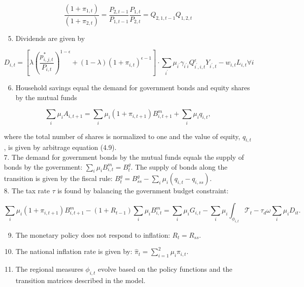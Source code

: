 \documentclass[10pt]{article}
\begin{document}
$$
\frac{\left(1+\pi_{1, t}\right)}{\left(1+\pi_{2, t}\right)}=\frac{P_{2, t-1}}{P_{1, t-1}} \frac{P_{1, t}}{P_{2, t}}=Q_{2,1, t-1} Q_{1,2, t}
$$

\begin{enumerate}
  \setcounter{enumi}{4}
  \item Dividends are given by
\end{enumerate}

$$
D_{i, t}=\left[\lambda\left(\frac{p_{i, j, t}^{*}}{P_{i, t}}\right)^{1-\epsilon}+(1-\lambda)\left(1+\pi_{i, t}\right)^{\epsilon-1}\right] \cdot \sum_{i^{\prime}} \mu_{i^{\prime}} \gamma_{i^{\prime} i} Q_{i^{\prime}, i, t}^{\epsilon} Y_{i^{\prime}, t}-w_{i, t} L_{i, t} \forall i
$$

\begin{enumerate}
  \setcounter{enumi}{5}
  \item Household savings equal the demand for government bonds and equity shares by the mutual funds
\end{enumerate}

$$
\sum_{i} \mu_{i} A_{i, t+1}=\sum_{i} \mu_{i}\left(1+\pi_{i, t+1}\right) B_{i, t+1}^{m}+\sum_{i} \mu_{i} q_{i, t},
$$

where the total number of shares is normalized to one and the value of equity, $q_{i, t}$, is given by arbitrage equation (4.9).\\
7. The demand for government bonds by the mutual funds equals the supply of bonds by the government: $\sum_{i} \mu_{i} B_{i, t}^{m}=B_{t}^{g}$. The supply of bonds along the transition is given by the fiscal rule: $B_{t}^{g}=B_{s s}^{g}-\sum_{i} \mu_{i}\left(q_{i, t}-q_{i, s s}\right)$.\\
8. The tax rate $\tau$ is found by balancing the government budget constraint:

$$
\sum_{i} \mu_{i}\left(1+\pi_{i, t+1}\right) B_{i, t+1}^{m}-\left(1+R_{t-1}\right) \sum_{i} \mu_{i} B_{i, t}^{m}=\sum_{i} \mu_{i} G_{i, t}-\sum_{i} \mu_{i} \int_{\phi_{i, t}} \mathcal{T}_{t}-\tau_{d} \omega \sum_{i} \mu_{i} D_{i t} .
$$

\begin{enumerate}
  \setcounter{enumi}{8}
  \item The monetary policy does not respond to inflation: $R_{t}=R_{s s}$.
  \item The national inflation rate is given by: $\hat{\pi}_{t}=\sum_{i=1}^{2} \mu_{i} \pi_{i, t}$.
  \item The regional measures $\phi_{i, t}$ evolve based on the policy functions and the transition matrices described in the model.
\end{enumerate}
\end{document}
